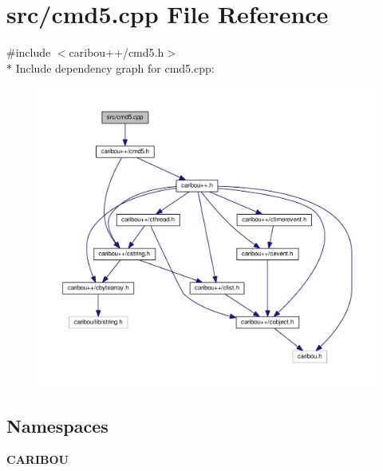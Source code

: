 \section{src/cmd5.cpp File Reference}
\label{cmd5_8cpp}
{\ttfamily \#include $<$caribou++/cmd5.\+h$>$}\\*
Include dependency graph for cmd5.\+cpp\+:
\nopagebreak
\begin{figure}[H]
\begin{center}
\leavevmode
\includegraphics[width=350pt]{cmd5_8cpp__incl}
\end{center}
\end{figure}
\subsection*{Namespaces}
\begin{DoxyCompactItemize}
\item 
 {\bf C\+A\+R\+I\+B\+OU}
\end{DoxyCompactItemize}
